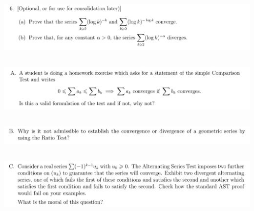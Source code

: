 \documentclass[12pt]{article}
\begin{document}
\newpage
\subsection{}
\begin{mdframed}
\includegraphics[width=400pt]{img/analysis--oxford-M2-I-6-6.png}
\end{mdframed}

\newpage
\subsection{}
\begin{mdframed}
\includegraphics[width=400pt]{img/analysis--oxford-M2-I-6-extra-A.png}
\end{mdframed}

\newpage
\subsection{}
\begin{mdframed}
\includegraphics[width=400pt]{img/analysis--oxford-M2-I-6-extra-B.png}
\end{mdframed}

\newpage
\subsection{}
\begin{mdframed}
\includegraphics[width=400pt]{img/analysis--oxford-M2-I-6-extra-C.png}
\end{mdframed}
\end{document}
